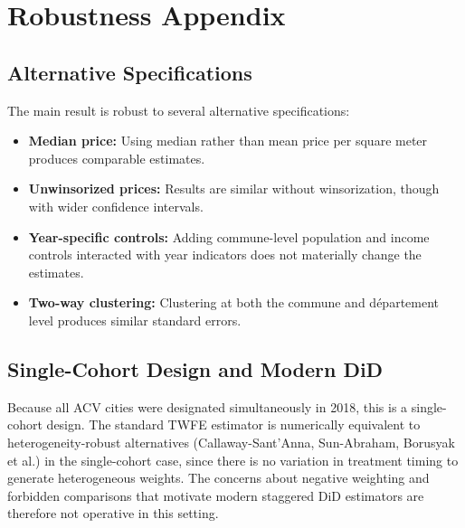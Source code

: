 \documentclass[12pt]{article}
\begin{document}
\section{Robustness Appendix}

\subsection{Alternative Specifications}

The main result is robust to several alternative specifications:
\begin{itemize}
    \item \textbf{Median price:} Using median rather than mean price per square meter produces comparable estimates.
    \item \textbf{Unwinsorized prices:} Results are similar without winsorization, though with wider confidence intervals.
    \item \textbf{Year-specific controls:} Adding commune-level population and income controls interacted with year indicators does not materially change the estimates.
    \item \textbf{Two-way clustering:} Clustering at both the commune and d\'{e}partement level produces similar standard errors.
\end{itemize}

\subsection{Single-Cohort Design and Modern DiD}

Because all ACV cities were designated simultaneously in 2018, this is a single-cohort design. The standard TWFE estimator is numerically equivalent to heterogeneity-robust alternatives (Callaway-Sant'Anna, Sun-Abraham, Borusyak et al.) in the single-cohort case, since there is no variation in treatment timing to generate heterogeneous weights. The concerns about negative weighting and forbidden comparisons that motivate modern staggered DiD estimators are therefore not operative in this setting.
\end{document}
